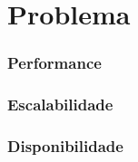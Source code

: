 \chapter{Problema}

\subsection{Performance}

\subsection{Escalabilidade}

\subsection{Disponibilidade}

